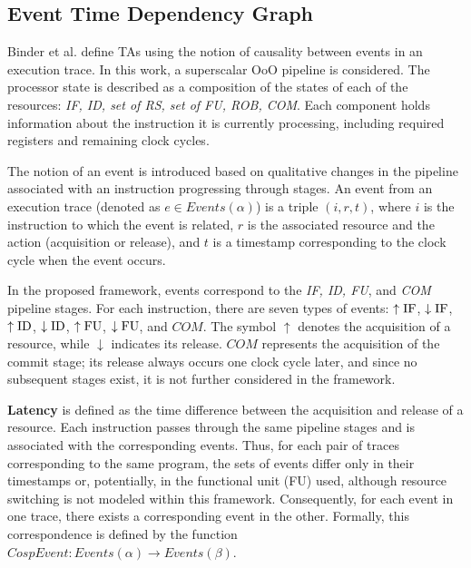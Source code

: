 
\subsection{Event Time Dependency Graph}

Binder et al. \cite{binder_definitions_2022} define TAs using the notion of causality between events in an execution trace. In this work, a superscalar OoO pipeline is considered. The processor state is described as a composition of the states of each of the resources: \textit{IF, ID, set of RS, set of FU, ROB, COM}. Each component holds information about the instruction it is currently processing, including required registers and remaining clock cycles.

The notion of an event is introduced based on qualitative changes in the pipeline associated with an instruction progressing through stages. An event from an execution trace (denoted as $e \in Events(\alpha)$) is a triple $(i,r,t)$, where $i$ is the instruction to which the event is related, $r$ is the associated resource and the action (acquisition or release), and $t$ is a timestamp corresponding to the clock cycle when the event occurs.

In the proposed framework, events correspond to the \textit{IF, ID, FU}, and \textit{COM} pipeline stages. For each instruction, there are seven types of events: $\uparrow\mathrm{IF}$, $\downarrow\mathrm{IF}$, $\uparrow\mathrm{ID}$, $\downarrow\mathrm{ID}$, $\uparrow\mathrm{FU}$, $\downarrow\mathrm{FU}$, and $COM$. The symbol $\uparrow$ denotes the acquisition of a resource, while $\downarrow$ indicates its release. $COM$ represents the acquisition of the commit stage; its release always occurs one clock cycle later, and since no subsequent stages exist, it is not further considered in the framework.

\textbf{Latency} is defined as the time difference between the acquisition and release of a resource. Each instruction passes through the same pipeline stages and is associated with the corresponding events. Thus, for each pair of traces corresponding to the same program, the sets of events differ only in their timestamps or, potentially, in the functional unit (FU) used, although resource switching is not modeled within this framework. Consequently, for each event in one trace, there exists a corresponding event in the other. Formally, this correspondence is defined by the function $CospEvent: Events(\alpha) \rightarrow Events(\beta)$.

